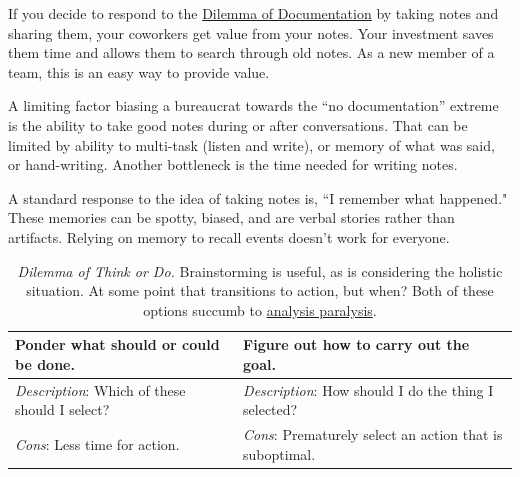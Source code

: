 If you decide to respond to the \hyperref[table:notes-or-no-notes]{Dilemma of Documentation} by taking notes and sharing them, your coworkers get value from your notes. Your investment saves them time and allows them to search through old notes. 
As a new member of a team, this is an easy way to provide value.  

A limiting factor biasing a bureaucrat towards the ``no documentation'' extreme is the ability to take good notes during or after conversations. That can be limited by ability to multi-task (listen and write), or memory of what was said, or hand-writing. Another bottleneck is the time needed for writing notes.

A standard response to the idea of taking notes is, ``I remember what happened." These memories can be spotty, biased, and are verbal stories rather than artifacts. 
Relying on memory to recall events doesn't work for everyone. 

\begin{center}
\begin{table}[H] %
\begin{tabular}{ | m{\dilemmatablewidth}| m{\dilemmatablewidth} | } 
  \hline
  \textbf{Ponder what should or could be done.} &
  \textbf{Figure out how to carry out the goal.}\\
  \hline
  \textit{Description}: Which of these should I select? & 
  \textit{Description}: How should I do the thing I selected? \\
  \hline
  \textit{Cons}: Less time for action. & 
  \textit{Cons}: Prematurely select an action that is suboptimal. \\
  \hline
\end{tabular}
\caption{\textit{Dilemma of Think or Do.}
Brainstorming is useful, as is considering the holistic situation. At some point that transitions to action, but when? %
Both of these options succumb to \href{https://en.wikipedia.org/wiki/Analysis_paralysis}{analysis paralysis}.
}
\label{table:forest-vs-trees}
\end{table}
\end{center}

